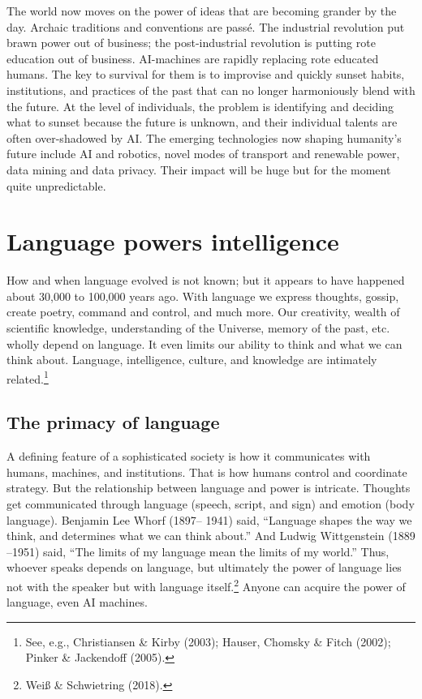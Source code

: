 \begin{multicols}{2}
The world now moves on the power of ideas that are becoming grander by the day. Archaic traditions and conventions are passé. The industrial revolution put brawn power out of business; the post-industrial revolution is putting rote education out of business. AI-machines are rapidly replacing rote educated humans. The key to survival for them is to improvise and quickly sunset habits, institutions, and practices of the past that can no longer harmoniously blend with the future. At the level of individuals, the problem is identifying and deciding what to sunset because the future is unknown, and their individual talents are often over-shadowed by AI. The emerging technologies now shaping humanity's future include AI and robotics, novel modes of transport and renewable power, data mining and data privacy. Their impact will be huge but for the moment quite unpredictable.\\[-20pt]

\section{Language powers intelligence}

How and when language evolved is not known; but it appears to have happened about 30,000 to 100,000 years ago. With language we express thoughts, gossip, create poetry, command and control, and much more. Our creativity, wealth of scientific knowledge, understanding of the Universe, memory of the past, etc. wholly depend on language. It even limits our ability to think and what we can think about. Language, intelligence, culture, and knowledge are intimately related.\footnote{See, e.g., Christiansen \& Kirby (2003); Hauser, Chomsky \& Fitch (2002); Pinker \& Jackendoff (2005).}\\[-18pt]

\subsection{The primacy of language}

A defining feature of a sophisticated society is how it communicates with humans, machines, and institutions. That is how humans control and coordinate strategy. But the relationship between language and power is intricate. Thoughts get communicated through language (speech, script, and sign) and emotion (body language). Benjamin Lee Whorf (1897– 1941) said, “Language shapes the way we think, and determines what we can think about.” And Ludwig Wittgenstein (1889 –1951) said, “The limits of my language mean the limits of my world.” Thus, whoever speaks depends on language, but ultimately the power of language lies not with the speaker but with language itself.\footnote{Weiß \& Schwietring (2018).}  Anyone can acquire the power of language, even AI machines.


\end{multicols}
